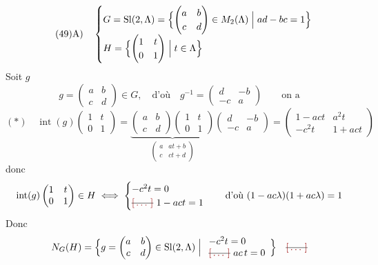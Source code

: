 \documentclass[11pt,a4paper]{article}
\begin{document}
\[
\tag{49}
\text{A)}\quad
\begin{cases}
G = \mathrm{Sl}(2,\Lambda) = \Bigl\{\begin{pmatrix} a & b\\ c & d\end{pmatrix}\in M_2(\Lambda) \Bigm| ad-bc=1\Bigr\}\\[4pt]
H = \Bigl\{\begin{pmatrix} 1 & t\\ 0 & 1\end{pmatrix} \Bigm| t\in\Lambda\Bigr\}
\end{cases}
\]
Soit $g$
\[
g = \begin{pmatrix} a & b\\ c & d\end{pmatrix}\in G, \quad\text{d'où}\quad
g^{-1} = \begin{pmatrix} d & -b\\ -c & a\end{pmatrix}\qquad \text{on a}
\]
\[
(*)\quad \operatorname{int}(g)\begin{pmatrix} 1 & t\\ 0 & 1\end{pmatrix}
= \underbrace{\begin{pmatrix} a & b\\ c & d\end{pmatrix}\begin{pmatrix} 1 & t\\ 0 & 1\end{pmatrix}}_{\begin{pmatrix} a & at+b\\ c & ct+d\end{pmatrix}}
\begin{pmatrix} d & -b\\ -c & a\end{pmatrix}
= \begin{pmatrix} 1-act & a^2 t\\ -c^2 t & 1+act\end{pmatrix}
\]
donc
\[
\operatorname{int}(g)\begin{pmatrix} 1 & t\\ 0 & 1\end{pmatrix}\in H
\iff
\begin{cases} -c^2 t = 0\\ \text{\struck{\ill{}}}\ 1-act = 1\end{cases}
\quad\text{d'où } (1-ac\lambda)(1+ac\lambda) = 1
\]
Donc
\[
N_G(H) = \Bigl\{ g=\begin{pmatrix} a & b\\ c & d\end{pmatrix}\in\mathrm{Sl}(2,\Lambda) \Bigm|
\begin{array}{l} -c^2 t = 0\\ \text{\struck{\ill{}}}\ ac\,t = 0\end{array} \Bigr\}
\quad \text{\struck{\ill{}}}
\]
\end{document}
